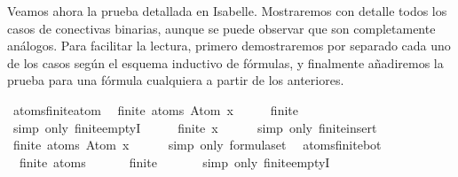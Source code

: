 \begin{isabellebody}
\begin{isamarkuptext}
  Veamos ahora la prueba detallada en Isabelle. Mostraremos con detalle 
  todos los casos de conectivas binarias, aunque se puede observar que 
  son completamente análogos. Para facilitar la lectura, primero 
  demostraremos por separado cada uno de los casos según el esquema 
  inductivo de fórmulas, y finalmente añadiremos la prueba para una 
  fórmula cualquiera a partir de los anteriores.%
\end{isamarkuptext}\isamarkuptrue%
\isamarkupfalse%
\ atoms{\isacharunderscore}finite{\isacharunderscore}atom{\isacharcolon}\isanewline
\ \ {\isachardoublequoteopen}finite\ {\isacharparenleft}atoms\ {\isacharparenleft}Atom\ x{\isacharparenright}{\isacharparenright}{\isachardoublequoteclose}\isanewline
%
\isadelimproof
%
\endisadelimproof
%
\isatagproof
{}\isamarkupfalse%
\ {\isacharminus}\isanewline
\ \ \isamarkupfalse%
\ {\isachardoublequoteopen}finite\ {\isasymemptyset}{\isachardoublequoteclose}\isanewline
\ \ \ \ \isamarkupfalse%
\ {\isacharparenleft}simp\ only{\isacharcolon}\ finite{\isachardot}emptyI{\isacharparenright}\isanewline
\ \ \isamarkupfalse%
\ \isamarkupfalse%
\ {\isachardoublequoteopen}finite\ {\isacharbraceleft}x{\isacharbraceright}{\isachardoublequoteclose}\isanewline
\ \ \ \ \isamarkupfalse%
\ {\isacharparenleft}simp\ only{\isacharcolon}\ finite{\isacharunderscore}insert{\isacharparenright}\isanewline
\ \ \isamarkupfalse%
\ \isamarkupfalse%
\ {\isachardoublequoteopen}finite\ {\isacharparenleft}atoms\ {\isacharparenleft}Atom\ x{\isacharparenright}{\isacharparenright}{\isachardoublequoteclose}\isanewline
\ \ \ \ \isamarkupfalse%
\ {\isacharparenleft}simp\ only{\isacharcolon}\ formula{\isachardot}set{\isacharparenleft}{}{\isacharparenright}{\isacharparenright}\ \isanewline
{}\isamarkupfalse%
%
\endisatagproof
{\isafoldproof}%
%
\isadelimproof
\isanewline
%
\endisadelimproof
\isanewline
{}\isamarkupfalse%
\ atoms{\isacharunderscore}finite{\isacharunderscore}bot{\isacharcolon}\isanewline
\ \ {\isachardoublequoteopen}finite\ {\isacharparenleft}atoms\ {\isasymbottom}{\isacharparenright}{\isachardoublequoteclose}\isanewline
%
\isadelimproof
%
\endisadelimproof
%
\isatagproof
{}\isamarkupfalse%
\ {\isacharminus}\isanewline
\ \ \isamarkupfalse%
\ {\isachardoublequoteopen}finite\ {\isasymemptyset}{\isachardoublequoteclose}\isanewline
\ \ \ \ \isamarkupfalse%
\ {\isacharparenleft}simp\ only{\isacharcolon}\ finite{\isachardot}emptyI{\isacharparenright}\isanewline

\end{isabellebody}

